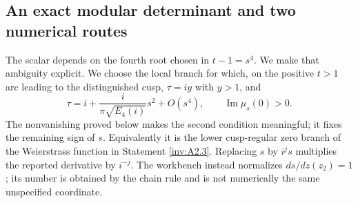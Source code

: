 \subsection{An exact modular determinant and two numerical routes}

The scalar depends on the fourth root chosen in $t-1=s^4$.  We make
that ambiguity explicit.  We choose the local branch for which, on
the positive $t>1$ arc leading to the distinguished cusp,
$\tau=iy$ with $y>1$, and
\begin{equation}\label{inv:eq:A-s-branch}
\tau=i+\frac{i}{\pi\sqrt{E_4(i)}}s^2+O(s^4),\qquad
\operatorname{Im}\mu_s(0)>0.
\end{equation}
The nonvanishing proved below makes the second condition meaningful;
it fixes the remaining sign of $s$.  Equivalently it is the lower
cusp-regular zero branch of the Weierstrass function in Statement \ref{inv:A2.3}.
Replacing $s$ by $i^js$ multiplies the reported derivative by $i^{-j}$.
The workbench instead normalizes $ds/dz(z_2)=1$; its number is obtained
by the chain rule and is not numerically the same unspecified coordinate.

